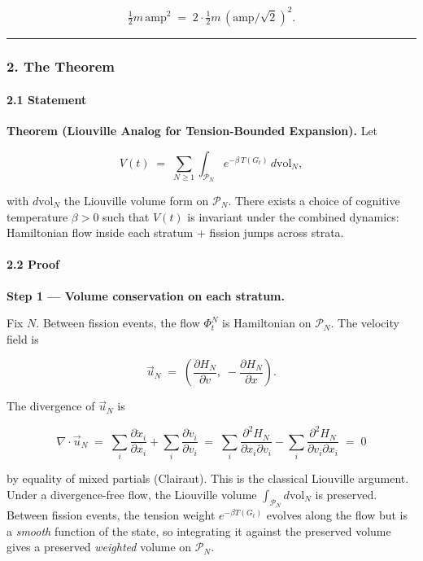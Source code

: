 \documentclass[
  11pt,
  a4paper,
]{article}
\begin{document}
\[
\tfrac{1}{2} m \, \text{amp}^2 \;=\; 2 \cdot \tfrac{1}{2} m \, (\text{amp}/\sqrt{2})^2.
\]

\begin{center}\rule{0.5\linewidth}{0.5pt}\end{center}

\subsubsection{2. The Theorem}\label{the-theorem}

\paragraph{2.1 Statement}\label{statement-1}

\textbf{Theorem (Liouville Analog for Tension-Bounded Expansion).} Let

\[
V(t) \;=\; \sum_{N \geq 1} \int_{\mathcal{P}_N} e^{-\beta \, T(G_t)} \, d\text{vol}_N,
\]

with \(d\text{vol}_N\) the Liouville volume form on \(\mathcal{P}_N\).
There exists a choice of cognitive temperature \(\beta > 0\) such that
\(V(t)\) is invariant under the combined dynamics: Hamiltonian flow
inside each stratum + fission jumps across strata.

\paragraph{2.2 Proof}\label{proof}

\textbf{Step 1 --- Volume conservation on each stratum.}

Fix \(N\). Between fission events, the flow \(\Phi_t^N\) is Hamiltonian
on \(\mathcal{P}_N\). The velocity field is

\[
\vec{u}_N \;=\; \left( \frac{\partial H_N}{\partial v}, \; -\frac{\partial H_N}{\partial x} \right).
\]

The divergence of \(\vec{u}_N\) is

\[
\nabla \cdot \vec{u}_N \;=\;
\sum_i \frac{\partial \dot{x}_i}{\partial x_i} + \sum_i \frac{\partial \dot{v}_i}{\partial v_i}
\;=\; \sum_i \frac{\partial^2 H_N}{\partial x_i \partial v_i} - \sum_i \frac{\partial^2 H_N}{\partial v_i \partial x_i}
\;=\; 0
\]

by equality of mixed partials (Clairaut). This is the classical
Liouville argument. Under a divergence-free flow, the Liouville volume
\(\int_{\mathcal{P}_N} d\text{vol}_N\) is preserved. Between fission
events, the tension weight \(e^{-\beta T(G_t)}\) evolves along the flow
but is a \emph{smooth} function of the state, so integrating it against
the preserved volume gives a preserved \emph{weighted} volume on
\(\mathcal{P}_N\).
\end{document}

